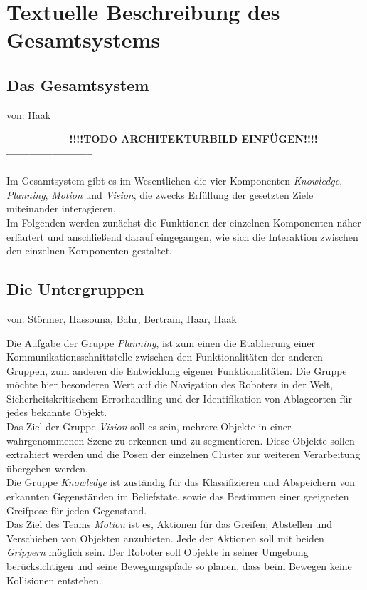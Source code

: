 \documentclass{suturo}
\makeatletter
\newcommand{\chapterauthor}[1]{%
  {\parindent0pt\vspace*{-27pt}%
  \linespread{0}\small\begin{flushright}von: #1\end{flushright}%
  \par\nobreak\vspace*{0pt}}
  \@afterheading%
}
\makeatother
\begin{document}
\section{Textuelle Beschreibung des Gesamtsystems}
\subsection{Das Gesamtsystem}
\chapterauthor{Haak}
\textbf{-----------------!!!!TODO ARCHITEKTURBILD EINFÜGEN!!!!-----------------------}\\ \\
Im Gesamtsystem gibt es im Wesentlichen die vier Komponenten \textit{Knowledge}, \textit{Planning}, \textit{Motion} und \textit{Vision}, die zwecks Erfüllung der gesetzten Ziele miteinander interagieren.\\
Im Folgenden werden zunächst die Funktionen der einzelnen Komponenten näher erläutert und anschließend darauf eingegangen,
wie sich die Interaktion zwischen den einzelnen Komponenten gestaltet.
\subsection{Die Untergruppen}
\chapterauthor{Störmer, Hassouna, Bahr, Bertram, Haar, Haak}
Die Aufgabe der Gruppe \textit{Planning}, ist zum einen die Etablierung einer Kommunikationsschnittstelle zwischen den Funktionalitäten der anderen Gruppen, zum anderen die Entwicklung eigener Funktionalitäten. Die Gruppe möchte hier besonderen Wert auf die Navigation des Roboters in der Welt, Sicherheitskritischem Errorhandling und der Identifikation von Ablageorten für jedes bekannte Objekt. \\

Das Ziel der Gruppe \textit{Vision} soll es sein, mehrere Objekte in einer wahrgenommenen Szene zu erkennen und zu segmentieren. Diese Objekte sollen extrahiert werden und die Posen der einzelnen Cluster zur weiteren Verarbeitung übergeben werden. \\

Die Gruppe \textit{Knowledge} ist zuständig für das Klassifizieren und Abspeichern von erkannten Gegenständen im Beliefstate, sowie das Bestimmen einer geeigneten Greifpose für jeden Gegenstand.\\

Das Ziel des Teams \textit{Motion} ist es, Aktionen für das Greifen, Abstellen und Verschieben von Objekten anzubieten. Jede der Aktionen soll mit beiden \textit{Grippern} möglich sein. Der Roboter soll Objekte in seiner Umgebung berücksichtigen und seine Bewegungspfade so planen, dass beim Bewegen keine Kollisionen entstehen.\\
\end{document}
